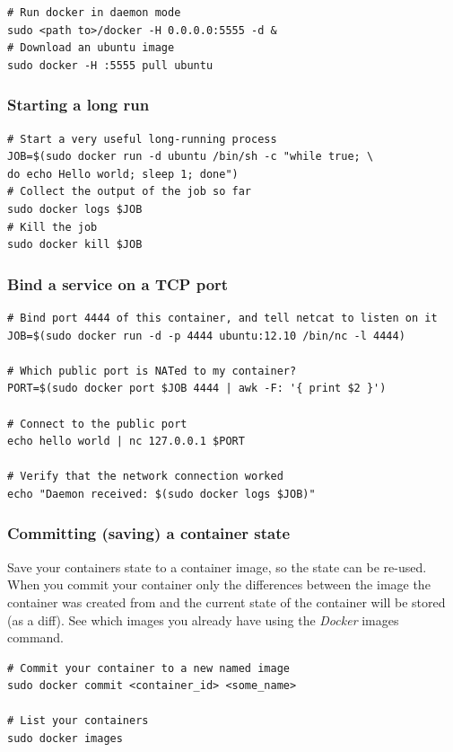 \documentclass[captions=tableheading]{article}
\begin{document}
\begin{verbatim}
# Run docker in daemon mode
sudo <path to>/docker -H 0.0.0.0:5555 -d &
# Download an ubuntu image
sudo docker -H :5555 pull ubuntu
\end{verbatim}
\subsubsection{Starting a long run}
\label{sec-2-2-5}


\begin{verbatim}
# Start a very useful long-running process
JOB=$(sudo docker run -d ubuntu /bin/sh -c "while true; \
do echo Hello world; sleep 1; done")
# Collect the output of the job so far
sudo docker logs $JOB
# Kill the job
sudo docker kill $JOB
\end{verbatim}
\subsubsection{Bind a service on a TCP port}
\label{sec-2-2-6}


\begin{verbatim}
# Bind port 4444 of this container, and tell netcat to listen on it
JOB=$(sudo docker run -d -p 4444 ubuntu:12.10 /bin/nc -l 4444)

# Which public port is NATed to my container?
PORT=$(sudo docker port $JOB 4444 | awk -F: '{ print $2 }')

# Connect to the public port
echo hello world | nc 127.0.0.1 $PORT

# Verify that the network connection worked
echo "Daemon received: $(sudo docker logs $JOB)"
\end{verbatim}
\subsubsection{Committing (saving) a container state}
\label{sec-2-2-7}

Save your containers state to a container image, so the state can be re-used.
When you commit your container only the differences between the image the container was created from and the current state of the container will be stored (as a diff). See which images you already have using the \emph{Docker} images command.

\begin{verbatim}
# Commit your container to a new named image
sudo docker commit <container_id> <some_name>

# List your containers
sudo docker images
\end{verbatim}
\end{document}
